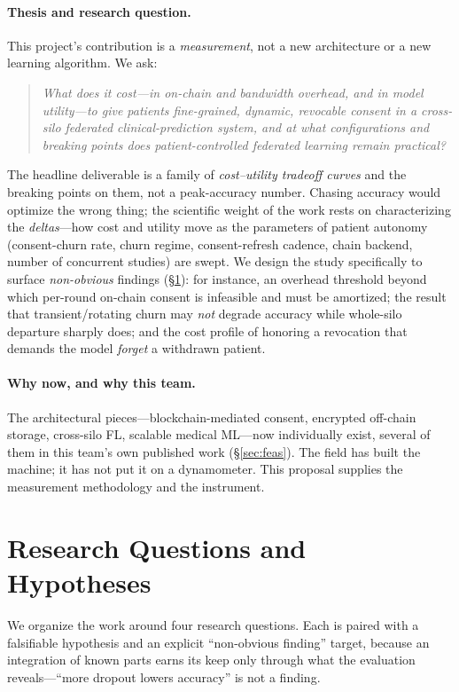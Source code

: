 \documentclass[11pt]{article}
\begin{document}
\paragraph{Thesis and research question.}
This project's contribution is a \emph{measurement}, not a new architecture or a
new learning algorithm. We ask:
\begin{quote}
\emph{What does it cost---in on-chain and bandwidth overhead, and in model
utility---to give patients fine-grained, dynamic, revocable consent in a
cross-silo federated clinical-prediction system, and at what configurations and
breaking points does patient-controlled federated learning remain practical?}
\end{quote}
The headline deliverable is a family of \emph{cost--utility tradeoff curves} and
the breaking points on them, not a peak-accuracy number. Chasing accuracy would
optimize the wrong thing; the scientific weight of the work rests on
characterizing the \emph{deltas}---how cost and utility move as the parameters of
patient autonomy (consent-churn rate, churn regime, consent-refresh cadence,
chain backend, number of concurrent studies) are swept. We design the study
specifically to surface \emph{non-obvious} findings (\S\ref{sec:rq}): for
instance, an overhead threshold beyond which per-round on-chain consent is
infeasible and must be amortized; the result that transient/rotating churn may
\emph{not} degrade accuracy while whole-silo departure sharply does; and the cost
profile of honoring a revocation that demands the model \emph{forget} a
withdrawn patient.

\paragraph{Why now, and why this team.}
The architectural pieces---blockchain-mediated consent, encrypted off-chain
storage, cross-silo FL, scalable medical ML---now individually exist, several of
them in this team's own published work (\S\ref{sec:feas}). The field has built
the machine; it has not put it on a dynamometer. This proposal supplies the
measurement methodology and the instrument.

\section{Research Questions and Hypotheses}\label{sec:rq}
We organize the work around four research questions. Each is paired with a
falsifiable hypothesis and an explicit ``non-obvious finding'' target, because an
integration of known parts earns its keep only through what the evaluation
reveals---``more dropout lowers accuracy'' is not a finding.
\end{document}
